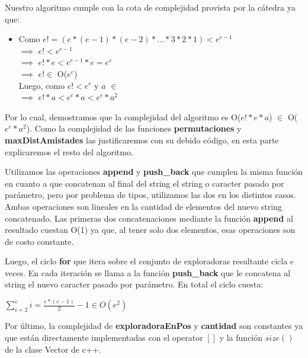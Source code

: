 \documentclass[11pt]{article}
\begin{document}
Nuestro algoritmo cumple con la cota de complejidad provista por la cátedra ya que:
\begin{itemize}
  \item Como $e! = (e*(e-1)*(e-2)*...*3*2*1) < e^{e-1}$ \\ $\implies$ $e! < e^{e-1}$ \\ $\implies$ $e!*e < e^{e-1}*e 
    = e^{e}$ \\ $\implies$ $e! \in$ O($e^e$) \\
    Luego, como $e! < e^e$ y $a$ $\in$ \\ $\implies$ $e!*a < e^e*a < e^e*a^2$
\end{itemize}
Por lo cual, demostramos que la complejidad del algoritmo es O($e!*e*a$) $\in$ O($e^e*a^2$).
Como la complejidad de las funciones \textbf{permutaciones} 
y \textbf{maxDistAmistades} las justificaremos con su debido código, en esta parte explicaremos el resto del 
algoritmo. 

Utilizamos las operaciones \textbf{append} y \textbf{push\_back} que cumplen la misma función en cuanto a que
concatenan al final del string el string o caracter pasado por parámetro, pero por problema de tipos, 
utilizamos las dos en los distintos casos. Ambas operaciones son lineales en la cantidad de elementos del nuevo string concatenado.
Las primeras dos concatenaciones mediante la función \textbf{append} al resultado cuestan O(1) ya que, al 
tener solo dos elementos, esas operaciones son de costo constante.

Luego, el ciclo \textbf{for} que itera sobre el conjunto de exploradoras resultante cicla $e$ veces. En cada
iteración se llama a la función \textbf{push\_back} que le concatena al string el nuevo caracter pasado por parámetro.
En total el ciclo cuesta:

\begin{center}
$\sum\limits_{i=2}^e i = \frac{e*(e-1)}{2} - 1 \in O(e^2)$
\end{center}

Por último, la complejidad de \textbf{exploradoraEnPos} y \textbf{cantidad} son constantes ya que están
directamente implementadas con el operator $[]$ y la función $size()$ de la clase Vector de c++.
\end{document}
